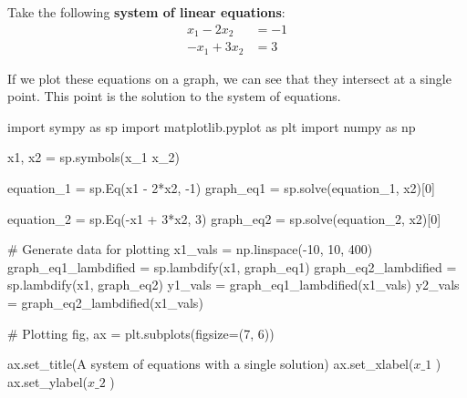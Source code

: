 \documentclass[
  letterpaper,
  DIV=11,
  numbers=noendperiod]{scrreprt}
\newenvironment{Shaded}{\begin{snugshade}}{\end{snugshade}}
\newcommand{\CommentTok}[1]{\textcolor[rgb]{0.37,0.37,0.37}{#1}}
\newcommand{\DecValTok}[1]{\textcolor[rgb]{0.68,0.00,0.00}{#1}}
\newcommand{\ImportTok}[1]{\textcolor[rgb]{0.00,0.46,0.62}{#1}}
\newcommand{\NormalTok}[1]{\textcolor[rgb]{0.00,0.23,0.31}{#1}}
\newcommand{\OperatorTok}[1]{\textcolor[rgb]{0.37,0.37,0.37}{#1}}
\newcommand{\StringTok}[1]{\textcolor[rgb]{0.13,0.47,0.30}{#1}}
\begin{document}
Take the following \textbf{system of linear equations}: \[
\begin{align*}
x_1 - 2x_2 &= -1\\
-x_1 + 3x_2 &= 3
\end{align*}
\]

If we plot these equations on a graph, we can see that they intersect at
a single point. This point is the solution to the system of equations.

\begin{Shaded}
\begin{Highlighting}[]
\ImportTok{import}\NormalTok{ sympy }\ImportTok{as}\NormalTok{ sp}
\ImportTok{import}\NormalTok{ matplotlib.pyplot }\ImportTok{as}\NormalTok{ plt}
\ImportTok{import}\NormalTok{ numpy }\ImportTok{as}\NormalTok{ np}

\NormalTok{x1, x2 }\OperatorTok{=}\NormalTok{ sp.symbols(}\StringTok{\textquotesingle{}x\_1 x\_2\textquotesingle{}}\NormalTok{)}

\NormalTok{equation\_1 }\OperatorTok{=}\NormalTok{ sp.Eq(x1 }\OperatorTok{{-}} \DecValTok{2}\OperatorTok{*}\NormalTok{x2, }\OperatorTok{{-}}\DecValTok{1}\NormalTok{)}
\NormalTok{graph\_eq1 }\OperatorTok{=}\NormalTok{ sp.solve(equation\_1, x2)[}\DecValTok{0}\NormalTok{]}

\NormalTok{equation\_2 }\OperatorTok{=}\NormalTok{ sp.Eq(}\OperatorTok{{-}}\NormalTok{x1 }\OperatorTok{+} \DecValTok{3}\OperatorTok{*}\NormalTok{x2, }\DecValTok{3}\NormalTok{)}
\NormalTok{graph\_eq2 }\OperatorTok{=}\NormalTok{ sp.solve(equation\_2, x2)[}\DecValTok{0}\NormalTok{]}

\CommentTok{\# Generate data for plotting}
\NormalTok{x1\_vals }\OperatorTok{=}\NormalTok{ np.linspace(}\OperatorTok{{-}}\DecValTok{10}\NormalTok{, }\DecValTok{10}\NormalTok{, }\DecValTok{400}\NormalTok{)}
\NormalTok{graph\_eq1\_lambdified }\OperatorTok{=}\NormalTok{ sp.lambdify(x1, graph\_eq1)}
\NormalTok{graph\_eq2\_lambdified }\OperatorTok{=}\NormalTok{ sp.lambdify(x1, graph\_eq2)}
\NormalTok{y1\_vals }\OperatorTok{=}\NormalTok{ graph\_eq1\_lambdified(x1\_vals)}
\NormalTok{y2\_vals }\OperatorTok{=}\NormalTok{ graph\_eq2\_lambdified(x1\_vals)}

\CommentTok{\# Plotting}
\NormalTok{fig, ax }\OperatorTok{=}\NormalTok{ plt.subplots(figsize}\OperatorTok{=}\NormalTok{(}\DecValTok{7}\NormalTok{, }\DecValTok{6}\NormalTok{))}

\NormalTok{ax.set\_title(}\StringTok{\textquotesingle{}A system of equations with a single solution\textquotesingle{}}\NormalTok{)}
\NormalTok{ax.set\_xlabel(}\StringTok{\textquotesingle{}$x\_1$                                                                                                                            \textquotesingle{}}\NormalTok{)}
\NormalTok{ax.set\_ylabel(}\StringTok{\textquotesingle{}$x\_2$                                                                                                    \textquotesingle{}}\NormalTok{)}


\end{Highlighting}
\end{Shaded}
\end{document}
